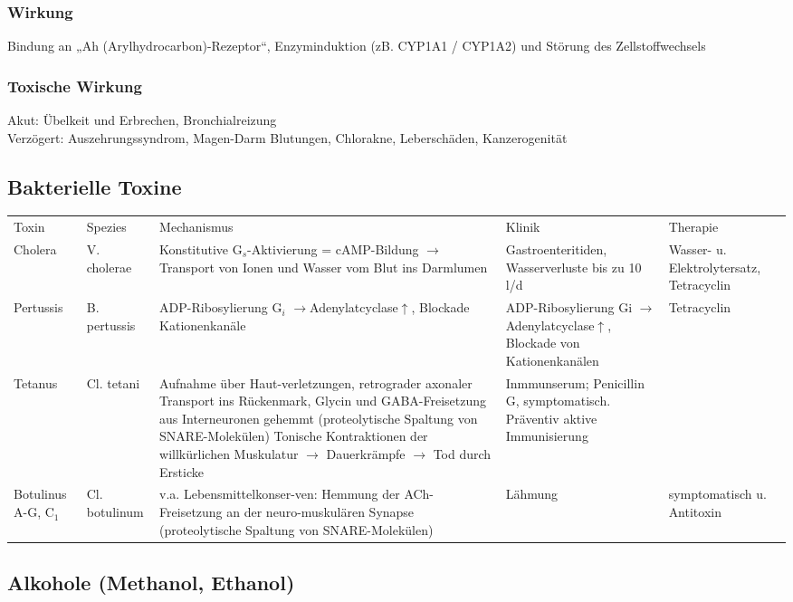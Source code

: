 \documentclass[10pt,a4paper]{report}
\begin{document}
\subsubsection{Wirkung} %
\label{ssub:wirkung}
Bindung an „Ah (Arylhydrocarbon)-Rezeptor“, Enzyminduktion (zB. CYP1A1 / CYP1A2) und Störung des Zellstoffwechsels 
\subsubsection{Toxische Wirkung} %
\label{ssub:toxische_wirkung}
Akut: Übelkeit und Erbrechen, Bronchialreizung\\
Verzögert: Auszehrungssyndrom, Magen-Darm Blutungen, Chlorakne, Leberschäden, Kanzerogenität 
\subsection{Bakterielle Toxine} %
\label{sub:bakterielle_toxine}
\begin{tabularx}{\textwidth}{llXXX}
Toxin&Spezies&Mechanismus&Klinik&Therapie\\
Cholera&V. cholerae&Konstitutive G$_s$-Aktivierung = cAMP-Bildung $\rightarrow$ Transport von Ionen und Wasser vom Blut ins Darmlumen&Gastroenteritiden, Wasserverluste bis zu 10 l/d&Wasser- u. Elektrolytersatz, Tetracyclin\\
Pertussis&B. pertussis&ADP-Ribosylierung G$_i$ $\rightarrow$Adenylatcyclase$\uparrow$, Blockade Kationenkanäle&ADP-Ribosylierung Gi $\rightarrow$ Adenylatcyclase$\uparrow$, Blockade von Kationenkanälen&Tetracyclin\\
Tetanus&Cl. tetani&Aufnahme über Haut-verletzungen, retrograder axonaler Transport ins Rückenmark, Glycin und GABA-Freisetzung aus Interneuronen gehemmt (proteolytische Spaltung von SNARE-Molekülen)
Tonische Kontraktionen der willkürlichen Muskulatur $\rightarrow$ Dauerkrämpfe $\rightarrow$ Tod durch Ersticke&Inmmunserum; Penicillin G, symptomatisch. Präventiv aktive Immunisierung\\
Botulinus A-G, C$_1$&Cl. botulinum&v.a. Lebensmittelkonser-ven: Hemmung der ACh-Freisetzung an der neuro-muskulären Synapse (proteolytische Spaltung von SNARE-Molekülen)&Lähmung&symptomatisch u. Antitoxin\\
\end{tabularx}
\subsection{Alkohole (Methanol, Ethanol)} %
\label{sub:alkohole_}
\end{document}
